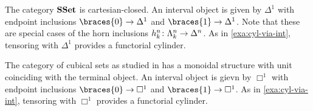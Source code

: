 \documentclass[reqno,10pt,a4paper,oneside,draft]{amsart}
\begin{document}
\begin{example} \label{exa:cyl-in-sset}
The category $\mathbf{SSet}$ is cartesian-closed.
An interval object is given by $\Delta^1$  with endpoint inclusions $\braces{0} \to \Delta^1$ and $\braces{1} \to \Delta^1$.
Note that these are special cases of the horn inclusions $h_k^n \colon \Lambda_k^n \to \Delta^n$.
As in \cref{exa:cyl-via-int}, tensoring with $\Delta^1$ provides a functorial cylinder.
\begin{comment}
The category $\SSet$ can be equipped with a functorial cylinder, given by the endofunctor $\Delta_1 \times (-) \co \SSet \to \SSet$.
For $k \in \braces{0, 1}$, the endpoint inclusion $\kcyl \co \id_\SSet \to \Delta_1 \times (-)$ is given by the natural transformation with components
\[
  (h^k_1, \id_X) \co A \to \Delta_1 \times A
\]
where the maps $h^0_1 \, , h^1_1 \co 1 \to \Delta_1$ are the two endpoint inclusions.
Note that these are special cases of the horn inclusions $h^k_n \co \Lambda^k_n \to \Delta_n$.
\end{comment}
\end{example}

\begin{example} \label{exa:cyl-in-cuset}
The category of cubical sets  as studied in  has a monoidal structure with unit coinciding with the terminal object.
An interval object is gievn by $\Box^1$  with endpoint inclusions $\braces{0} \to \Box^1$ and $\braces{1} \to \Box^1$.
As in \cref{exa:cyl-via-int}, tensoring with $\Box^1$ provides a functorial cylinder.
\end{example}

\medskip
\end{document}
